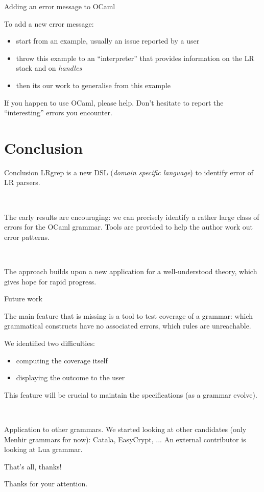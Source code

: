 \documentclass{beamer}          %
\begin{document}
\begin{frame}{Adding an error message to OCaml}

  To add a new error message:
  \begin{itemize}
    \item start from an example, usually an issue reported by a user
    \item throw this example to an ``interpreter'' that provides information on the LR stack and on {\em handles}
    \item then its our work to generalise from this example
  \end{itemize}
  \pause
  \begin{block}{If you happen to use OCaml, please help.}
    Don't hesitate to report the ``interesting'' errors you encounter.
  \end{block}
\end{frame}

\section{Conclusion}

\begin{frame}{Conclusion}
  LRgrep is a new DSL ({\em domain specific language}) to identify error of LR parsers.

\

  The early results are encouraging: we can precisely identify a rather large class of errors for the OCaml grammar. Tools are provided to help the author work out error patterns.

\

  The approach builds upon a new application for a well-understood theory, which gives hope for rapid progress.

\end{frame}

\begin{frame}{Future work}

  The main feature that is missing is a tool to test coverage of a grammar:
  which grammatical constructs have no associated errors, which rules are unreachable.

  We identified two difficulties:
\begin{itemize}
  \item computing the coverage itself
  \item displaying the outcome to the user
\end{itemize}

This feature will be crucial to maintain the specifications (as a grammar evolve).

\

\pause
Application to other grammars. We started looking at other candidates (only Menhir grammars for now): Catala, EasyCrypt, ...
An external contributor is looking at Lua grammar.

\end{frame}

\begin{frame}{That's all, thanks!}

  Thanks for your attention.

\end{frame}
\end{document}
